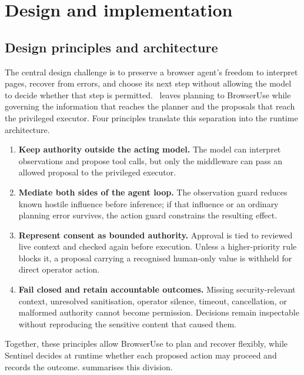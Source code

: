 \chapter{Design and implementation}
\label{chap:design}

\section{Design principles and architecture}

The central design challenge is to preserve a browser agent's freedom to
interpret pages, recover from errors, and choose its next step without allowing
the model to decide whether that step is permitted. \systemname\ leaves planning
to BrowserUse while governing the information that reaches the planner and the
proposals that reach the privileged executor. Four principles translate this
separation into the runtime architecture.

\begin{enumerate}
  \item \textbf{Keep authority outside the acting model.} The model can
  interpret observations and propose tool calls, but only the middleware can
  pass an allowed proposal to the privileged executor.

  \item \textbf{Mediate both sides of the agent loop.} The observation guard
  reduces known hostile influence before inference; if that influence or an
  ordinary planning error survives, the action guard constrains the resulting
  effect.

  \item \textbf{Represent consent as bounded authority.} Approval is tied to
  reviewed live context and checked again before execution. Unless a
  higher-priority rule blocks it, a proposal carrying a recognised human-only
  value is withheld for direct operator action.

  \item \textbf{Fail closed and retain accountable outcomes.} Missing
  security-relevant context, unresolved sanitisation, operator silence,
  timeout, cancellation, or malformed authority cannot become permission.
  Decisions remain inspectable without reproducing the sensitive content that
  caused them.
\end{enumerate}

Together, these principles allow BrowserUse to plan and recover flexibly, while
Sentinel decides at runtime whether each proposed action may proceed and records
the outcome.  summarises this division.


